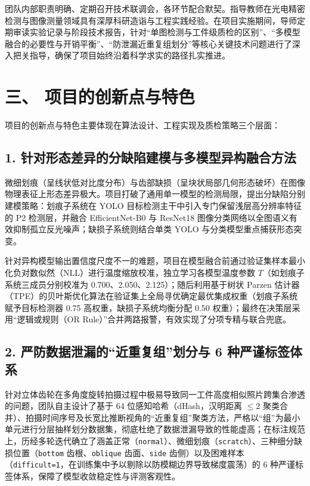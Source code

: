 团队内部职责明确、定期召开技术联调会，各环节配合默契。指导教师在光电精密检测与图像测量领域具有深厚科研造诣与工程实践经验。在项目实施期间，导师定期审读实验记录与阶段技术报告，针对“单图检测与工件级质检的区别”、“多模型融合的必要性与开销平衡”、“防泄漏近重复组划分”等核心关键技术问题进行了深入把关指导，确保了项目始终沿着科学求实的路径扎实推进。

\section*{三、 项目的创新点与特色}

项目的创新点与特色主要体现在算法设计、工程实现及质检策略三个层面：

\subsection*{1. 针对形态差异的分缺陷建模与多模型异构融合方法}
微细划痕（呈线状低对比度分布）与齿部缺损（呈块状局部几何形态破坏）在图像物理表征上形态差异极大。项目打破了通用单一模型的检测局限，提出分缺陷分别建模策略：划痕子系统在 YOLO 目标检测主干中引入专门保留浅层高分辨率特征的 P2 检测层，并融合 EfficientNet-B0 与 ResNet18 图像分类网络以全图语义有效抑制孤立反光噪声；缺损子系统则结合单类 YOLO 与分类模型重点捕获形态突变。

针对异构模型输出置信度尺度不一的难题，项目在模型融合前通过验证集样本最小化负对数似然（NLL）进行温度缩放校准，独立学习各模型温度参数 $T$（如划痕子系统三成员分别校准为 0.700、2.050、2.125）；随后利用基于树状 Parzen 估计器（TPE）的贝叶斯优化算法在验证集上全局寻优确定最优集成权重（划痕子系统赋予目标检测器 0.75 高权重，缺损子系统均衡分配 0.50 权重）；最终在决策层采用“逻辑或规则（OR Rule）”合并两路报警，有效实现了分项专精与联合兜底。

\subsection*{2. 严防数据泄漏的“近重复组”划分与 6 种严谨标签体系}
针对立体齿轮在多角度旋转拍摄过程中极易导致同一工件高度相似照片跨集合渗透的问题，团队自主设计了基于 64 位感知哈希（dHash，汉明距离 $\le 2$ 聚类合并）、拍摄时间序号及长宽比推断视角的“近重复组”聚类方法，严格以“组”为最小单元进行分层抽样划分数据集，彻底杜绝了数据泄漏导致的性能虚高；在标注规范上，历经多轮迭代确立了涵盖正常（\texttt{normal}）、微细划痕（\texttt{scratch}）、三种细分缺损位置（\texttt{bottom} 齿根、\texttt{oblique} 齿面、\texttt{side} 齿侧）以及困难样本（\texttt{difficult=1}，在训练集中予以剔除以防模糊边界导致梯度震荡）的 6 种严谨标签体系，保障了模型收敛稳定性与评测客观性。

